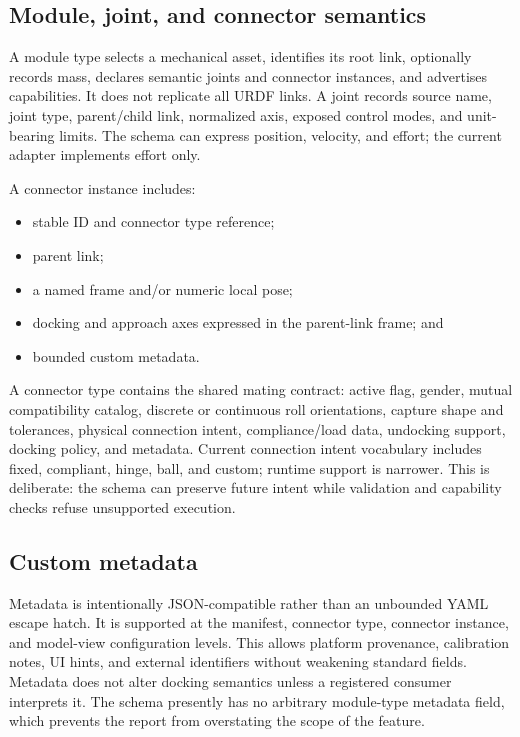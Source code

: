 \subsection{Module, joint, and connector semantics}

A module type selects a mechanical asset, identifies its root link, optionally records
mass, declares semantic joints and connector instances, and advertises capabilities.
It does not replicate all URDF links. A joint records source name, joint type,
parent/child link, normalized axis, exposed control modes, and unit-bearing limits.
The schema can express position, velocity, and effort; the current \mujoco{} adapter
implements effort only.

A connector instance includes:

\begin{itemize}
  \item stable ID and connector type reference;
  \item parent link;
  \item a named frame and/or numeric local pose;
  \item docking and approach axes expressed in the parent-link frame; and
  \item bounded custom metadata.
\end{itemize}

A connector type contains the shared mating contract: active flag, gender, mutual
compatibility catalog, discrete or continuous roll orientations, capture shape and
tolerances, physical connection intent, compliance/load data, undocking support,
docking policy, and metadata. Current connection intent vocabulary includes fixed,
compliant, hinge, ball, and custom; runtime support is narrower. This is deliberate:
the schema can preserve future intent while validation and capability checks refuse
unsupported execution.

\subsection{Custom metadata}

Metadata is intentionally JSON-compatible rather than an unbounded YAML escape hatch.
It is supported at the manifest, connector type, connector instance, and model-view
configuration levels. This allows platform provenance, calibration notes, UI hints,
and external identifiers without weakening standard fields. Metadata does not alter
docking semantics unless a registered consumer interprets it. The schema presently has
no arbitrary module-type metadata field, which prevents the report from overstating
the scope of the feature.

